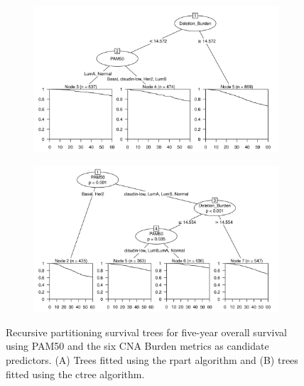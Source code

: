 \begin{figure}[!htb]
\centering

\vspace{0.5cm}

\begin{subfigure}{\textwidth}
\subcaption{}
\includegraphics[width=1\textwidth]{../figures/Appendices/Appendix_B/PartyKit_Survival_Burden_FiveYearOS_PAM50.png}
\end{subfigure}

\vspace{2cm}

\begin{subfigure}{\textwidth}
\subcaption{}
\includegraphics[width=1\textwidth]{../figures/Appendices/Appendix_B/Ctree_Survival_Burden_FiveYearOS_PAM50.png}
\end{subfigure}

\vspace{0.5cm}

\caption[Recursive partitioning survival trees for five-year overall survival using PAM50 and the six CNA Burden metrics as candidate predictors.]{Recursive partitioning survival trees for five-year overall survival using PAM50 and the six CNA Burden metrics as candidate predictors. (A) Trees fitted using the rpart algorithm and (B) trees fitted using the ctree algorithm.}
\end{figure}

